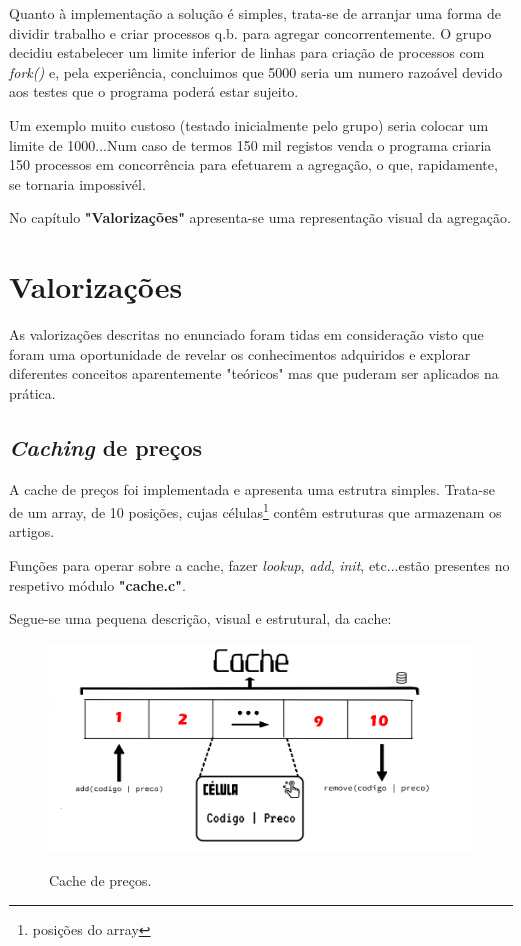 \documentclass[a4paper,11pt]{report}
\begin{document}
Quanto à implementação a solução é simples, trata-se de arranjar uma forma de dividir trabalho e criar processos q.b. para agregar concorrentemente. O grupo decidiu estabelecer um limite inferior de linhas para criação de processos com  \textit{fork()} e, pela experiência, concluimos que 5000 seria um numero razoável devido aos testes que o programa poderá estar sujeito. 
\vspace{1.0cm}

Um exemplo muito custoso (testado inicialmente pelo grupo) seria colocar um limite de 1000...Num caso de termos 150 mil registos venda o programa criaria 150 processos em concorrência para efetuarem a agregação, o que, rapidamente, se tornaria impossivél.
\vspace{1.0cm}
\par No capítulo \textbf{"Valorizações"} apresenta-se uma representação visual da agregação.


\chapter{Valorizações}

\hspace{0.50cm} As valorizações descritas no enunciado foram tidas em consideração visto que foram uma oportunidade de revelar os conhecimentos adquiridos e explorar diferentes conceitos aparentemente "teóricos" mas que puderam ser aplicados na prática.

\section{\textit{Caching} de preços}

\hspace{0.50cm} A cache de preços foi implementada e apresenta uma estrutra simples. Trata-se de um array, de 10 posições, cujas células\footnote{posições do array} contêm estruturas que armazenam os artigos. \par

Funções para operar sobre a cache, fazer \textit{lookup}, \textit{add}, \textit{init}, etc...estão presentes no respetivo módulo \textbf{"cache.c"}.

Segue-se uma pequena descrição, visual e estrutural, da cache:

\begin{figure}[H]
    \vspace{1.0cm}
    \centering
    \includegraphics[scale=0.6]{cache.png}
    \label{img:htag}
    \caption{Cache de preços.}
\end{figure}
\end{document}

